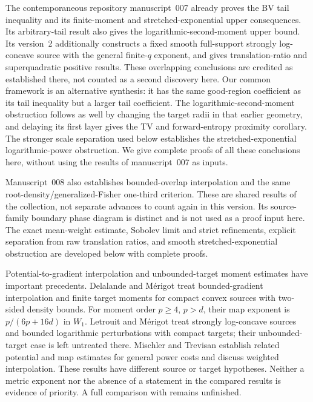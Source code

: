 \documentclass[11pt]{article}
\numberwithin{equation}{section}
\theoremstyle{remark}\newtheorem{remark}[theorem]{Remark}
\begin{document}
The contemporaneous repository manuscript~007 \cite{TailManuscriptV2} already proves the BV tail inequality and its finite-moment and stretched-exponential upper consequences. Its arbitrary-tail result also gives the logarithmic-second-moment upper bound. Its version~2 additionally constructs a fixed smooth full-support strongly log-concave source with the general finite-$q$ exponent, and gives translation-ratio and superquadratic positive results. These overlapping conclusions are credited as established there, not counted as a second discovery here. Our common framework is an alternative synthesis: it has the same good-region coefficient as its tail inequality but a larger tail coefficient. The logarithmic-second-moment obstruction follows as well by changing the target radii in that earlier geometry, and delaying its first layer gives the TV and forward-entropy proximity corollary. The stronger scale separation used below establishes the stretched-exponential logarithmic-power obstruction. We give complete proofs of all these conclusions here, without using the results of manuscript~007 as inputs.


Manuscript~008 \cite{OverlapManuscriptV1} also establishes bounded-overlap interpolation and the same root-density/generalized-Fisher one-third criterion. These are shared results of the collection, not separate advances to count again in this version. Its source-family boundary phase diagram is distinct and is not used as a proof input here. The exact mean-weight estimate, Sobolev limit and strict refinements, explicit separation from raw translation ratios, and smooth stretched-exponential obstruction are developed below with complete proofs.

Potential-to-gradient interpolation and unbounded-target moment estimates have important precedents. Delalande and M\'erigot \cite[Proposition~4.1 and Corollary~4.4]{DelalandeMerigot2023} treat bounded-gradient interpolation and finite target moments for compact convex sources with two-sided density bounds. For moment order $p\ge4$, $p>d$, their map exponent is $p/(6p+16d)$ in $W_1$. Letrouit and M\'erigot \cite[Theorem~1.4 and Remark~1.5]{LetrouitMerigot2026} treat strongly log-concave sources and bounded logarithmic perturbations with compact targets; their unbounded-target case is left untreated there. Mischler and Trevisan \cite{MischlerTrevisan2026} establish related potential and map estimates for general power costs and discuss weighted interpolation. These results have different source or target hypotheses. Neither a metric exponent nor the absence of a statement in the compared results is evidence of priority. A full comparison with \cite{Merigot2026} remains unfinished.
\end{document}
